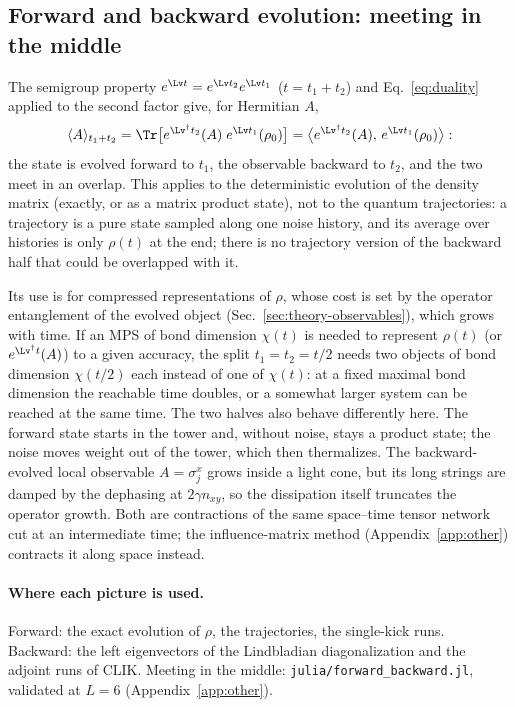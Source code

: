 \subsection{Forward and backward evolution: meeting in the middle}
\label{sec:meet}

The semigroup property $e^{\Lv t} = e^{\Lv t_2}e^{\Lv t_1}$ ($t = t_1 + t_2$) and Eq.~\eqref{eq:duality} applied to the second factor give, for Hermitian $A$,
\begin{equation}
\langle A\rangle_{t_1 + t_2} = \Tr\big[e^{\Lv^\dagger t_2}(A)\;e^{\Lv t_1}(\rho_0)\big] = \big\langle e^{\Lv^\dagger t_2}(A),\, e^{\Lv t_1}(\rho_0)\big\rangle :
\label{eq:meet}
\end{equation}
the state is evolved forward to $t_1$, the observable backward to $t_2$, and the two meet in an overlap. This applies to the deterministic evolution of the density matrix (exactly, or as a matrix product state), not to the quantum trajectories: a trajectory is a pure state sampled along one noise history, and its average over histories is only $\rho(t)$ at the end; there is no trajectory version of the backward half that could be overlapped with it.

Its use is for compressed representations of $\rho$, whose cost is set by the operator entanglement of the evolved object (Sec.~\ref{sec:theory-observables}), which grows with time. If an MPS of bond dimension $\chi(t)$ is needed to represent $\rho(t)$ (or $e^{\Lv^\dagger t}(A)$) to a given accuracy, the split $t_1 = t_2 = t/2$ needs two objects of bond dimension $\chi(t/2)$ each instead of one of $\chi(t)$: at a fixed maximal bond dimension the reachable time doubles, or a somewhat larger system can be reached at the same time. The two halves also behave differently here. The forward state starts in the tower and, without noise, stays a product state; the noise moves weight out of the tower, which then thermalizes. The backward-evolved local observable $A = \sigma^x_j$ grows inside a light cone, but its long strings are damped by the dephasing at $2\gamma n_{xy}$, so the dissipation itself truncates the operator growth. Both are contractions of the same space--time tensor network cut at an intermediate time; the influence-matrix method (Appendix~\ref{app:other}) contracts it along space instead.

\paragraph{Where each picture is used.} Forward: the exact evolution of $\rho$, the trajectories, the single-kick runs. Backward: the left eigenvectors of the Lindbladian diagonalization and the adjoint runs of CLIK. Meeting in the middle: \texttt{julia/forward\_backward.jl}, validated at $L = 6$ (Appendix~\ref{app:other}).


